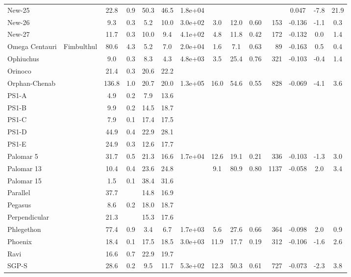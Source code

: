 \begin{tabular}{llSSSSSSSSrSSS}
New-25 &  & 22.8 & 0.9 & 50.3 & 46.5 & 1.8e+04 &  &  &  &  & 0.047 & -7.8 & 21.9 \\
New-26 &  & 9.3 & 0.3 & 5.2 & 10.0 & 3.0e+02 & 3.0 & 12.0 & 0.60 & 153 & -0.136 & -1.1 & 0.3 \\
New-27 &  & 11.7 & 0.3 & 10.0 & 9.4 & 4.1e+02 & 4.8 & 11.8 & 0.42 & 172 & -0.132 & 0.0 & 1.4 \\
Omega Centauri & Fimbulthul & 80.6 & 4.3 & 5.2 & 7.0 & 2.0e+04 & 1.6 & 7.1 & 0.63 & 89 & -0.163 & 0.5 & 0.4 \\
Ophiuchus &  & 9.0 & 0.3 & 8.3 & 4.3 & 4.8e+03 & 3.5 & 25.4 & 0.76 & 321 & -0.103 & -0.4 & 1.4 \\
Orinoco &  & 21.4 & 0.3 & 20.6 & 22.2 &  &  &  &  &  &  &  &  \\
Orphan-Chenab &  & 136.8 & 1.0 & 20.7 & 20.0 & 1.3e+05 & 16.0 & 54.6 & 0.55 & 828 & -0.069 & -4.1 & 3.6 \\
PS1-A &  & 4.9 & 0.2 & 7.9 & 13.6 &  &  &  &  &  &  &  &  \\
PS1-B &  & 9.9 & 0.2 & 14.5 & 18.7 &  &  &  &  &  &  &  &  \\
PS1-C &  & 7.9 & 0.1 & 17.4 & 17.5 &  &  &  &  &  &  &  &  \\
PS1-D &  & 44.9 & 0.4 & 22.9 & 28.1 &  &  &  &  &  &  &  &  \\
PS1-E &  & 24.9 & 0.3 & 12.6 & 17.7 &  &  &  &  &  &  &  &  \\
Palomar 5 &  & 31.7 & 0.5 & 21.3 & 16.6 & 1.7e+04 & 12.6 & 19.1 & 0.21 & 336 & -0.103 & -1.3 & 3.0 \\
Palomar 13 &  & 10.4 & 0.4 & 23.6 & 24.8 &  & 9.1 & 80.9 & 0.80 & 1137 & -0.058 & 2.0 & 3.4 \\
Palomar 15 &  & 1.5 & 0.1 & 38.4 & 31.6 &  &  &  &  &  &  &  &  \\
Parallel &  & 37.7 &  & 14.8 & 16.9 &  &  &  &  &  &  &  &  \\
Pegasus &  & 8.6 & 0.2 & 18.0 & 18.7 &  &  &  &  &  &  &  &  \\
Perpendicular &  & 21.3 &  & 15.3 & 17.6 &  &  &  &  &  &  &  &  \\
Phlegethon &  & 77.4 & 0.9 & 3.4 & 6.7 & 1.7e+03 & 5.6 & 27.6 & 0.66 & 364 & -0.098 & 2.0 & 0.9 \\
Phoenix &  & 18.4 & 0.1 & 17.5 & 18.5 & 3.0e+03 & 11.9 & 17.7 & 0.19 & 312 & -0.106 & -1.6 & 2.6 \\
Ravi &  & 16.6 & 0.7 & 22.9 & 19.7 &  &  &  &  &  &  &  &  \\
SGP-S &  & 28.6 & 0.2 & 9.5 & 11.7 & 5.3e+02 & 12.3 & 50.3 & 0.61 & 727 & -0.073 & -2.3 & 3.8 \\

\end{tabular}
